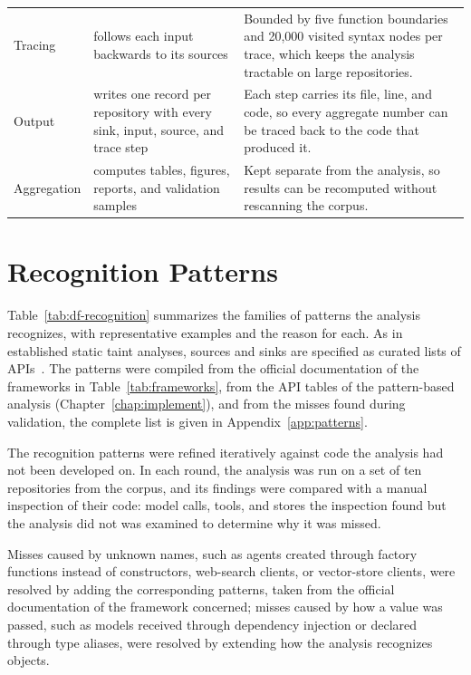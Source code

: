 \begin{table}[t]
\begin{tabular}{@{}>{\raggedright\arraybackslash}p{}>{\raggedright\arraybackslash}p{}>{\raggedright\arraybackslash}p{}@{}}
Tracing & follows each input backwards to its sources & Bounded by five function boundaries and 20{,}000 visited syntax nodes per trace, which keeps the analysis tractable on large repositories. \\
Output & writes one record per repository with every sink, input, source, and trace step & Each step carries its file, line, and code, so every aggregate number can be traced back to the code that produced it. \\
Aggregation & computes tables, figures, reports, and validation samples & Kept separate from the analysis, so results can be recomputed without rescanning the corpus. \\
\bottomrule
\end{tabular}
\end{table}

\section{Recognition Patterns}
\label{sec:df-recognition}

Table~\ref{tab:df-recognition} summarizes the families of patterns the analysis recognizes, with representative examples and the reason for each. As in established static taint analyses, sources and sinks are specified as curated lists of APIs~\cite{arzt2014flowdroid,rasthofer2014susi}. The patterns were compiled from the official documentation of the frameworks in Table~\ref{tab:frameworks}, from the API tables of the pattern-based analysis (Chapter~\ref{chap:implement}), and from the misses found during validation, the complete list is given in Appendix~\ref{app:patterns}.

The recognition patterns were refined iteratively against code the analysis had not been developed on. In each round, the analysis was run on a set of ten repositories from the corpus, and its findings were compared with a manual inspection of their code: model calls, tools, and stores the inspection found but the analysis did not was examined to determine why it was missed.

Misses caused by unknown names, such as agents created through factory functions instead of constructors, web-search clients, or vector-store clients, were resolved by adding the corresponding patterns, taken from the official documentation of the framework concerned; misses caused by how a value was passed, such as models received through dependency injection or declared through type aliases, were resolved by extending how the analysis recognizes objects. 

